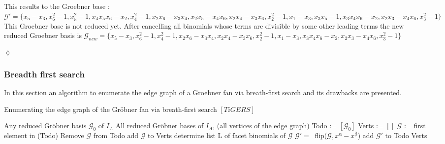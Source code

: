 \begin{env_example}
This results to the Groebner base : \\
$\mathcal{G}' = \{x_{5}-x_{3}, x_{6}^{2}-1, x_{5}^{2}-1, x_{4}x_{5}x_{6}-x_{2}, x_{4}^{2}-1, x_{2}x_{6}-x_{3}x_{4},
x_{2}x_{5}-x_{4}x_{6}, x_{2}x_{4}-x_{3}x_{6} ,x_{2}^{2}-1,x_{1}-x_{3},x_{3}x_{5}-1,x_{3}x_{4}x_{6}-x_{2},x_{2}x_{3}-x_{4}x_{6},x_{3}^{2}-1   \}$ \\

This Groebner base is not reduced yet. After cancelling all binomials whose terms are divisible by some other leading terms the new reduced Groebner basis is 
$\mathcal{G}_{new} = \{x_{5}-x_{3},x_{6}^{2}-1,x_{4}^{2}-1,x_{2}x_{6}-x_{3}x_{4},x_{2}x_{4}-x_{3}x_{6},x_{2}^{2}-1,x_{1}-x_{3}, x_{3}x_{4}x_{6}-x_{2},x_{2}x_{3}-x_{4}x_{6},x_{3}^{2}-1 \} $

\begin{flushright}
$\lozenge$
\end{flushright}
\end{env_example}


\subsubsection{Breadth first search}

In this section an algorithm to enumerate the edge graph of a Groebner fan via breath-first search and its drawbacks are presented.

\begin{algorithm}
\caption{Enumerating the edge graph of the Gröbner fan via breath-first search $\left[ TiGERS\right]  $}
\label{alg:breath}
\begin{algorithmic}[1]

\Require
Any reduced Gröbner basis $ \mathcal{G}_0 $ of $I_A$
\Ensure All reduced Gröbner bases of $I_A$, (all vertices of the edge graph)
\State Todo := $\left[ \mathcal{G}_0 \right]  $
\State Verts := $\left[ \right] $
\State $\mathcal{G}$ := first element in (Todo)
\State Remove $\mathcal{G} $ from Todo
\State add $\mathcal{G}$ to Verts 
\State determine list L of facet binomials of $\mathcal{G} $
 \State $\mathcal{G}' =~$ flip($\mathcal{G},x^{\upalpha} - x^{\upbeta} $)
 \State add $\mathcal{G}'$ to Todo
 \EndIf
 \EndFor
\EndWhile 
\Return Verts

\end{algorithmic}
\end{algorithm}

